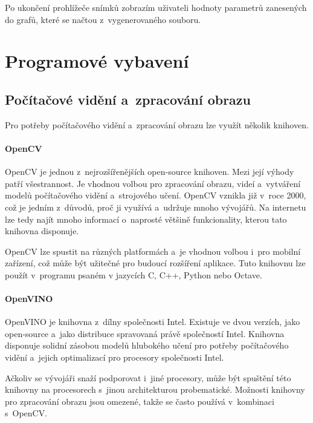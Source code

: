 Po ukončení prohlížeče snímků zobrazím uživateli hodnoty parametrů zanesených do grafů, které se načtou z~vygenerovaného souboru.




\section{Programové vybavení}

\subsection{Počítačové vidění a~zpracování obrazu}

Pro potřeby počítačového vidění a~zpracování obrazu lze využít několik knihoven.

\paragraph{OpenCV}

 OpenCV \citep{OpenCV} je jednou z~nejrozšířenějších open-source knihoven. Mezi její výhody patří všestrannost. Je vhodnou volbou pro zpracování obrazu, videí a~vytváření modelů počítačového vidění a~strojového učení. OpenCV vznikla již v~roce 2000, což je jedním z~důvodů, proč ji využívá a~udržuje mnoho vývojářů. Na internetu lze tedy najít mnoho informací o~naprosté většině funkcionality, kterou tato knihovna disponuje.

OpenCV lze spustit na různých platformách a~je vhodnou volbou i~pro mobilní zařízení, což může být užitečné pro budoucí rozšíření aplikace. Tuto knihovnu lze použít v~programu psaném v jazycích C, C++, Python nebo Octave.

\paragraph{OpenVINO}

OpenVINO je knihovna z~dílny společnosti Intel. Existuje ve dvou verzích, jako open-source a~jako distribuce spravovaná právě společností Intel. Knihovna disponuje solidní zásobou modelů hlubokého učení pro potřeby počítačového vidění a~jejich optimalizací pro procesory společnosti Intel.

Ačkoliv se vývojáři snaží podporovat i~jiné procesory, může být spuštění této knihovny na procesorech s~jinou architekturou probematické. Možnosti knihovny pro zpracování obrazu jsou omezené, takže se často používá v~kombinaci s~OpenCV.

